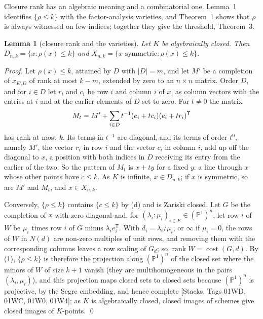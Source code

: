 \documentclass[11pt,letterpaper,reqno]{amsart}
\theoremstyle{spaced}
\newtheorem{lemma}{Lemma}
\begin{document}
Closure rank has an algebraic meaning and a combinatorial one. Lemma~1 identifies \(\{\rho \le k\}\) with the factor-analysis varieties, and Theorem~1 shows that \(\rho\) is always witnessed on few indices; together they give the threshold, Theorem~3.

\begin{lemma}[closure rank and the varieties]
Let \(K\) be algebraically closed. Then \(D_{n,k} = \{x : \rho(x) \le k\}\) and \(X_{n,k} = \{x \text{ symmetric} : \rho(x) \le k\}\).
\end{lemma}

\begingroup{} \emph{Proof.} Let \(\rho(x) \le k\), attained by \(D\) with \(\lvert D\rvert = m\), and let \(M'\) be a completion of \(x_{E \setminus D}\) of rank at most \(k - m\), extended by zero to an \(n \times n\) matrix. Order \(D\), and for \(i \in D\) let \(r_i\) and \(c_i\) be row \(i\) and column \(i\) of \(x\), as column vectors with the entries at \(i\) and at the earlier elements of \(D\) set to zero. For \(t \ne 0\) the matrix
\[M_t = M' + \sum_{i \in D} t^{-1} (e_i + t c_i)(e_i + t r_i)^{\mathsf T}\postdisplaypenalty=10000 \]
has rank at most \(k\). Its terms in \(t^{-1}\) are diagonal, and its terms of order \(t^0\), namely \(M'\), the vector \(r_i\) in row \(i\) and the vector \(c_i\) in column \(i\), add up off the diagonal to \(x\), a position with both indices in \(D\) receiving its entry from the earlier of the two. So the pattern of \(M_t\) is \(x + ty\) for a fixed \(y\): a line through \(x\) whose other points have \(c \le k\). As \(K\) is infinite, \(x \in D_{n,k}\); if \(x\) is symmetric, so are \(M'\) and \(M_t\), and \(x \in X_{n,k}\).\par\endgroup

Conversely, \(\{\rho \le k\}\) contains \(\{c \le k\}\) by (d) and is Zariski closed. Let \(G\) be the completion of \(x\) with zero diagonal and, for \((\lambda_i : \mu_i)_{i \in E} \in (\mathbb{P}^1)^n\), let row \(i\) of \(W\) be \(\mu_i\) times row \(i\) of \(G\) minus \(\lambda_i e_i^{\mathsf T}\). With \(d_i = \lambda_i / \mu_i\), or \(\infty\) if \(\mu_i = 0\), the rows of \(W\) in \(N(d)\) are non-zero multiples of unit rows, and removing them with the corresponding columns leaves a row scaling of \(G_d\); so \(\operatorname{rank} W = \operatorname{cost}(G, d)\). By (1), \(\{\rho \le k\}\) is therefore the projection along \((\mathbb{P}^1)^n\) of the closed set where the minors of \(W\) of size \(k+1\) vanish (they are multihomogeneous in the pairs \((\lambda_i, \mu_i)\)), and this projection maps closed sets to closed sets because \((\mathbb{P}^1)^n\) is projective, by the Segre embedding, and hence complete {[}Stacks, Tags 01WD, 01WC, 01W0, 01W4{]}; as \(K\) is algebraically closed, closed images of schemes give closed images of \(K\)-points. \qed
\end{document}
